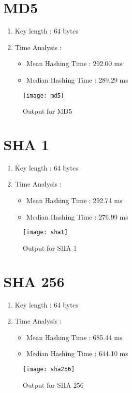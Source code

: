 \documentclass[11pt, pdftex]{article}
\begin{document}
\section{MD5}
\begin{enumerate}
	\item Key length : 64 bytes
	\item Time Analysis : 
	\begin{itemize}
		\item Mean Hashing Time : 292.00 ms
		\item Median Hashing Time : 289.29 ms
	\end{itemize}
\end{enumerate}
\begin{figure}[t]
	\caption{Output for MD5}
	\centering
	\texttt{[image: md5]}
\end{figure}

\section{SHA 1}
\begin{enumerate}
	\item Key length : 64 bytes
	\item Time Analysis : 
	\begin{itemize}
		\item Mean Hashing Time : 292.74 ms
		\item Median Hashing Time : 276.99 ms
	\end{itemize}
\end{enumerate}
\begin{figure}[t]
	\caption{Output for SHA 1}
	\centering
	\texttt{[image: sha1]}
\end{figure}

\section{SHA 256}
\begin{enumerate}
	\item Key length : 64 bytes
	\item Time Analysis : 
	\begin{itemize}
		\item Mean Hashing Time : 685.44 ms
		\item Median Hashing Time : 644.10 ms
	\end{itemize}
\end{enumerate}
\begin{figure}[t]
	\caption{Output for SHA 256}
	\centering
	\texttt{[image: sha256]}
\end{figure}
\end{document}
